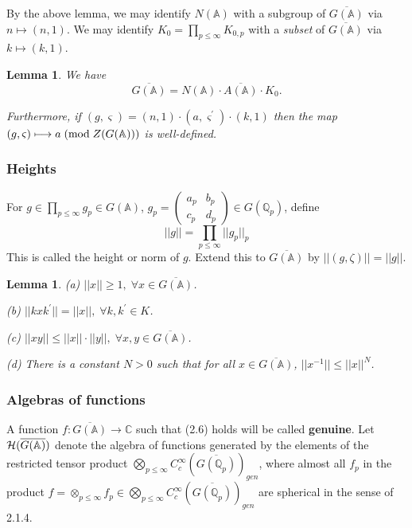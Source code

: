 \documentclass[12pt]{article}
\newtheorem{lemma}[theorem]{Lemma}
\def\aaa{\mathbb{A}}
\def\qqq{\mathbb{Q}}
\def\ccc{\mathbb{C}}
\begin{document}
By the above lemma, we may identify $N(\aaa )$ with a subgroup of $%
\overline{G(\aaa )}$ via $n\longmapsto (n,1)$. We may identify $%
K_0=\prod_{p\leq \infty }K_{0,p}$ with a {\em subset} of
$\overline{G(\aaa )}$ via $k\longmapsto (k,1)$.

\begin{lemma}
We have 
\[
\overline{G(\aaa )}
=N(\aaa )\cdot \overline{A(\aaa )}\cdot K_0.
\]

Furthermore, if $(g,\varsigma )=(n,1)\cdot (a,\varsigma ^{\prime })\cdot
(k,1)$ then the map
$(g,\varsigma )\longmapsto a\;({\rm mod}\;Z(G(\aaa )))$
is well-defined.
\end{lemma}

\subsubsection{Heights}

For $g\in \prod_{p\leq \infty }g_p\in G(\aaa )$,
$g_p=\left( 
\begin{array}{cc}
a_p & b_p \\ 
c_p & d_p
\end{array}
\right) \in G(\qqq_p)$, define 
\begin{equation}
||g||=\prod_{p\leq \infty }||g_p||_p
\end{equation}
This is called the height or norm of $g$. Extend this to
$\overline{G(\aaa )}$ by $||(g,\zeta)||=||g||$.

\begin{lemma}
(a) $||x||\geq 1,\;\forall x\in \overline{G(\aaa )}$.

(b) $||kxk^{\prime }||=||x||,\;\forall k,k^{\prime }\in K$.

(c) $||xy||\leq ||x||\cdot ||y||,\;\forall x,y\in \overline{G(\aaa )}$.

(d) There is a constant $N>0$ such that for all
$x\in \overline{G(\aaa )}$,
$||x^{-1}||\leq ||x||^N$.
\end{lemma}

\subsubsection{Algebras of functions}

A function $f:\overline{G(\aaa )}\rightarrow \ccc $
such that (2.6)
holds will be called {\bf genuine}. Let 
${\cal{H}}(\overline{G(\aaa )})$ denote the algebra of 
functions generated by the elements of the
restricted tensor product 
$\bigotimes_{p\leq \infty }
C_c^\infty (\overline{G(\qqq_p)})_{gen}$, 
where almost all $f_p$ in the product 
$f=\otimes _{p\leq \infty}f_p\in 
\bigotimes_{p\leq \infty }C_c^\infty (\overline{G(\qqq_p)})_{gen}$ are
spherical in the sense of 2.1.4.
\end{document}
